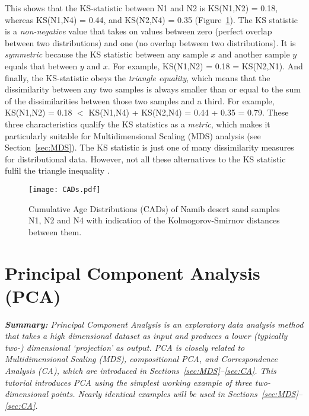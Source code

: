 \documentclass[11pt]{article}
\begin{document}
\begin{enumerate}
  This shows that the KS-statistic between N1 and N2 is KS(N1,N2) =
  0.18, whereas KS(N1,N4) = 0.44, and KS(N2,N4) = 0.35
  (Figure~\ref{fig:CADs}). The KS statistic is a \emph{non-negative}
  value that takes on values between zero (perfect overlap between two
  distributions) and one (no overlap between two distributions). It is
  \emph{symmetric} because the KS statistic between any sample $x$ and
  another sample $y$ equals that between $y$ and $x$. For example,
  KS(N1,N2) = 0.18 = KS(N2,N1).  And finally, the KS-statistic obeys
  the \emph{triangle equality}, which means that the dissimilarity
  between any two samples is always smaller than or equal to the sum
  of the dissimilarities between those two samples and a third.  For
  example, KS(N1,N2) = 0.18 $<$ KS(N1,N4) + KS(N2,N4) = 0.44 + 0.35 =
  0.79. These three characteristics qualify the KS statistics as a
  \emph{metric}, which makes it particularly suitable for
  Multidimensional Scaling (MDS) analysis (see Section~\ref{sec:MDS}).
  The KS statistic is just one of many dissimilarity measures for
  distributional data.  However, not all these alternatives to the KS
  statistic fulfil the triangle inequality \citep{vermeesch2018b}.

\end{enumerate}

\begin{figure}[!ht]
  \begin{minipage}[c]{0.69\textwidth}
    \texttt{[image: CADs.pdf]}
  \end{minipage}\hfill
  \begin{minipage}[c]{0.30\textwidth}
    \caption{
      Cumulative Age Distributions (CADs) of Namib desert sand
      samples N1, N2 and N4 with indication of the Kolmogorov-Smirnov
      distances between them.
    } \label{fig:CADs}
  \end{minipage}
\end{figure}


\section{Principal Component Analysis (PCA)}
\label{sec:PCA}

\textit{\textbf{Summary:} Principal Component Analysis is an
  exploratory data analysis method that takes a high dimensional
  dataset as input and produces a lower (typically two-) dimensional
  `projection' as output. PCA is closely related to Multidimensional
  Scaling (MDS), compositional PCA, and Correspondence Analysis (CA),
  which are introduced in Sections~\ref{sec:MDS}--\ref{sec:CA}. This
  tutorial introduces PCA using the simplest working example of three
  two-dimensional points. Nearly identical examples will be used in
  Sections~\ref{sec:MDS}--\ref{sec:CA}.}
\end{document}
